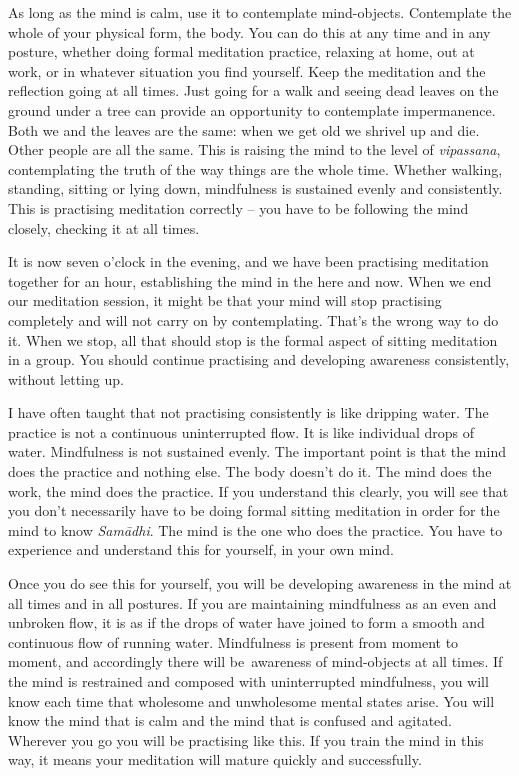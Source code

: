 As long as the mind is calm, use it to contemplate mind-objects. Contemplate the whole of your physical form, the body. You can do this at any time and in any posture, whether doing formal meditation practice, relaxing at home, out at work, or in whatever situation you find yourself. Keep the meditation and the reflection going at all times. Just going for a walk and seeing dead leaves on the ground under a tree can provide an opportunity to contemplate impermanence. Both we and the leaves are the same: when we get old we shrivel up and die. Other people are all the same. This is raising the mind to the level of \textit{vipassana}, contemplating the truth of the way things are the whole time. Whether walking, standing, sitting or lying down, mindfulness is sustained evenly and consistently. This is practising meditation correctly -- you have to be following the mind closely, checking it at all times.

It is now seven o'clock in the evening, and we have been practising meditation together for an hour, establishing the mind in the here and now. When we end our meditation session, it might be that your mind will stop practising completely and will not carry on by contemplating. That's the wrong way to do it. When we stop, all that should stop is the formal aspect of sitting meditation in a group. You should continue practising and developing awareness consistently, without letting up.

I have often taught that not practising consistently is like dripping water. The practice is not a continuous uninterrupted flow. It is like individual drops of water. Mindfulness is not sustained evenly. The important point is that the mind does the practice and nothing else. The body doesn't do it. The mind does the work, the mind does the practice. If you understand this clearly, you will see that you don't necessarily have to be doing formal sitting meditation in order for the mind to know \textit{Sam\=adhi}. The mind is the one who does the practice. You have to experience and understand this for yourself, in your own mind.

Once you do see this for yourself, you will be developing awareness in the mind at all times and in all postures. If you are maintaining mindfulness as an even and unbroken flow, it is as if the drops of water have joined to form a smooth and continuous flow of running water. Mindfulness is present from moment to moment, and accordingly there will be\linebreak\ awareness of mind-objects at all times. If the mind is restrained and composed with uninterrupted mindfulness, you will know each time that wholesome and unwholesome mental states arise. You will know the mind that is calm and the mind that is confused and agitated. Wherever you go you will be practising like this. If you train the mind in this way, it means your meditation will mature quickly and successfully.

